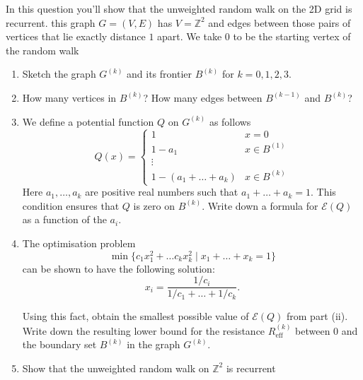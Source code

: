 \documentclass[12 pt, letterpaper]{hmcpset}
\begin{document}
\begin{problem}[48.]
	In this question you'll show that the unweighted random walk on the 2D grid is recurrent. this graph $G = (V, E)$ has $V = \mathbb{Z}^{2}$ and edges between those pairs of vertices that lie exactly distance $1$ apart. We take $0$ to be the starting vertex of the random walk
	\begin{enumerate}
		\item Sketch the graph $G^{(k)}$ and its frontier $B^{(k)}$ for $k = 0, 1, 2, 3$.

		\item How many vertices in $B^{(k)}$? How many edges between $B^{(k - 1)}$ and $B^{(k)}$?

		\item We define a potential function $Q$ on $G^{(k)}$ as follows
			\[
				Q(x) = \begin{cases}
					1 & x = 0 \\
					1 - a_{1} & x \in B^{(1)} \\
					\vdots \\
					1 - (a_{1} + \dots + a_{k}) & x \in B^{(k)}
				\end{cases}
			\]
			Here $a_{1}, \dots, a_{k}$ are positive real numbers such that $a_{1} + \dots + a_{k} = 1$. This condition ensures that $Q$ is zero on $B^{(k)}$. Write down a formula for $\mathcal{E}(Q)$ as a function of the $a_{i}$.

		\item The optimisation problem
			\[
				\min \{ c_{1} x_{1}^{2} + \dots c_{k} x_{k}^{2} \mid x_{1} + \dots + x_{k} = 1 \}
			\]
			can be shown to have the following solution:
			\[
				x_{i} = \frac{1 / c_{i}}{1 / c_{1} + \dots + 1 / c_{k}}.
			\]

			Using this fact, obtain the smallest possible value of $\mathcal{E}(Q)$ from part (ii). Write down the resulting lower bound for the resistance $R^{(k)}_{\text{eff}}$ between $0$ and the boundary set $B^{(k)}$ in the graph $G^{(k)}$.

		\item Show that the unweighted random walk on $\mathbb{Z}^{2}$ is recurrent
	\end{enumerate}
\end{problem}

\pagebreak
\end{document}
